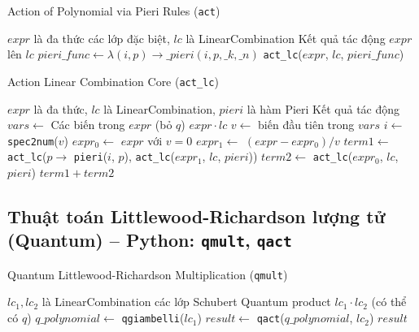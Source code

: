 \begin{algorithm}[H]
\caption{Action of Polynomial via Pieri Rules (\texttt{act})}
\begin{algorithmic}[1]
\REQUIRE $expr$ là đa thức các lớp đặc biệt, $lc$ là LinearCombination
\ENSURE Kết quả tác động $expr$ lên $lc$
\STATE $pieri\_func \gets \lambda(i,p) \to \_pieri(i, p, \_k, \_n)$
\RETURN \texttt{act\_lc}($expr$, $lc$, $pieri\_func$)
\end{algorithmic}
\end{algorithm}

\begin{algorithm}[H]
\caption{Action Linear Combination Core (\texttt{act\_lc})}
\begin{algorithmic}[1]
\REQUIRE $expr$ là đa thức, $lc$ là LinearCombination, $pieri$ là hàm Pieri
\ENSURE Kết quả tác động
\STATE $vars \gets$ Các biến trong $expr$ (bỏ $q$)
    \RETURN $expr \cdot lc$
\ENDIF
\STATE $v \gets$ biến đầu tiên trong $vars$
\STATE $i \gets$ \texttt{spec2num}($v$)
\STATE $expr_0 \gets$ $expr$ với $v=0$
\STATE $expr_1 \gets$ $(expr - expr_0)/v$
\STATE $term1 \gets$ \texttt{act\_lc}($p \to$ \texttt{pieri}($i$, $p$), \texttt{act\_lc}($expr_1$, $lc$, $pieri$))
\STATE $term2 \gets$ \texttt{act\_lc}($expr_0$, $lc$, $pieri$)
\RETURN $term1 + term2$
\end{algorithmic}
\end{algorithm}

\subsection*{Thuật toán Littlewood-Richardson lượng tử (Quantum) -- Python: \texttt{qmult}, \texttt{qact}}

\begin{algorithm}[H]
\caption{Quantum Littlewood-Richardson Multiplication (\texttt{qmult})}
\begin{algorithmic}[1]
\REQUIRE $lc_1, lc_2$ là LinearCombination các lớp Schubert
\ENSURE Quantum product $lc_1 \cdot lc_2$ (có thể có $q$)
\STATE $q\_polynomial \gets$ \texttt{qgiambelli}($lc_1$)
\STATE $result \gets$ \texttt{qact}($q\_polynomial$, $lc_2$)
\RETURN $result$
\end{algorithmic}
\end{algorithm}